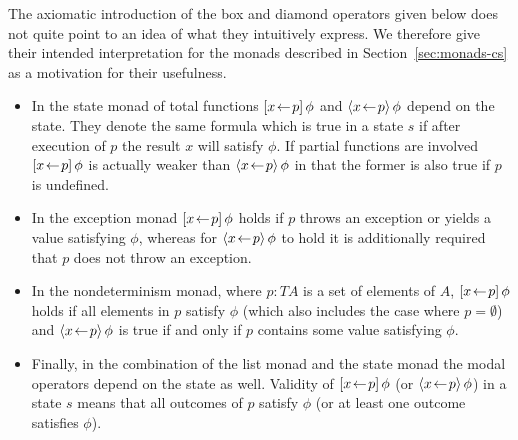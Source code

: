 \begin{expl}
  The axiomatic introduction of the box and diamond operators given below does
  not quite point to an idea of what they intuitively express. We therefore give
  their intended interpretation for the monads described in
  Section~\ref{sec:monads-cs} as a motivation for their usefulness.
  \begin{itemize}
  \item In the state monad of total functions $[x\!\gets\! p]\,{\phi}$ and
    $\langle x\!\gets\! p\rangle\,{\phi}$ depend on the state. They denote the same
    formula which is true in a state $s$ if after execution of $p$ the result
    $x$ will satisfy $\phi$. If partial functions are involved $[x\!\gets\!
      p]\,{\phi}$ is actually weaker than $\langle x\!\gets\! p\rangle\,{\phi}$ in that the former
    is also true if $p$ is undefined.
  \item In the exception monad $[x\!\gets\! p]\,{\phi}$ holds if $p$ throws an
    exception or yields a value satisfying $\phi$, whereas for $\langle x\!\gets\!
      p\rangle\,{\phi}$ to hold it is additionally required that $p$ does not throw an
    exception.
  \item In the nondeterminism monad, where $p : T A$ is a set of elements of
    $A$, $[x\!\gets\! p]\,{\phi}$ holds if all elements in $p$ satisfy $\phi$ (which
    also includes the case where $p = \emptyset$) and  $\langle x\!\gets\! p\rangle\,{\phi}$ is true
    if and only if $p$ contains some value satisfying $\phi$.
  \item Finally, in the combination of the list monad and the state monad the
    modal operators depend on the state as well. Validity of $[x\!\gets\!
      p]\,{\phi}$ (or $\langle x\!\gets\! p\rangle\,{\phi}$) in a state $s$ means that all outcomes
    of $p$ satisfy $\phi$ (or at least one outcome satisfies $\phi$).
  \end{itemize}
\end{expl}


